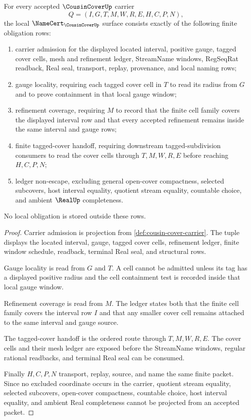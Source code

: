 \begin{theorem}
\label{thm:cousin-cover-namecert-obligations}
For every accepted $\CousinCoverUp$ carrier
$$
Q=(I,G,T,M,W,R,E,H,C,P,N),
$$
the local $\NameCert_{\CousinCoverUp}$ surface consists exactly of the following finite obligation rows:
\begin{enumerate}
\item carrier admission for the displayed located interval, positive gauge, tagged cover cells, mesh and refinement ledger, StreamName windows, RegSeqRat readback, Real seal, transport, replay, provenance, and local naming rows;
\item gauge locality, requiring each tagged cover cell in $T$ to read its radius from $G$ and to prove containment in that local gauge window;
\item refinement coverage, requiring $M$ to record that the finite cell family covers the displayed interval row and that every accepted refinement remains inside the same interval and gauge rows;
\item finite tagged-cover handoff, requiring downstream tagged-subdivision consumers to read the cover cells through $T,M,W,R,E$ before reaching $H,C,P,N$;
\item ledger non-escape, excluding general open-cover compactness, selected subcovers, host interval equality, quotient stream equality, countable choice, and ambient $\RealUp$ completeness.
\end{enumerate}
No local obligation is stored outside these rows.
\end{theorem}
\begin{proof}
Carrier admission is projection from \autoref{def:cousin-cover-carrier}. The tuple displays the located interval, gauge, tagged cover cells, refinement ledger, finite window schedule, readback, terminal Real seal, and structural rows.

Gauge locality is read from $G$ and $T$. A cell cannot be admitted unless its tag has a displayed positive radius and the cell containment test is recorded inside that local gauge window.

Refinement coverage is read from $M$. The ledger states both that the finite cell family covers the interval row $I$ and that any smaller cover cell remains attached to the same interval and gauge source.

The tagged-cover handoff is the ordered route through $T,M,W,R,E$. The cover cells and their mesh ledger are exposed before the StreamName windows, regular rational readbacks, and terminal Real seal can be consumed.

Finally $H,C,P,N$ transport, replay, source, and name the same finite packet. Since no excluded coordinate occurs in the carrier, quotient stream equality, selected subcovers, open-cover compactness, countable choice, host interval equality, and ambient Real completeness cannot be projected from an accepted packet.
\end{proof}

